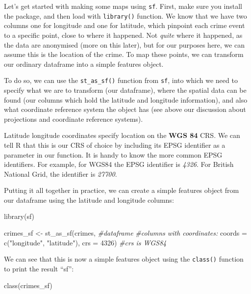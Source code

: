 \documentclass[
  krantz2]{krantz}
\makeatletter
\newenvironment{Shaded}{\begin{snugshade}}{\end{snugshade}}
\newcommand{\AttributeTok}[1]{\textcolor[rgb]{0.61,0.61,0.61}{#1}}
\newcommand{\CommentTok}[1]{\textcolor[rgb]{0.37,0.37,0.37}{\textit{#1}}}
\newcommand{\DecValTok}[1]{\textcolor[rgb]{0.06,0.06,0.06}{#1}}
\newcommand{\FunctionTok}[1]{\textcolor[rgb]{0,0,0}{#1}}
\newcommand{\NormalTok}[1]{#1}
\newcommand{\OtherTok}[1]{\textcolor[rgb]{0.37,0.37,0.37}{#1}}
\newcommand{\StringTok}[1]{\textcolor[rgb]{0.5,0.5,0.5}{#1}}
\newenvironment{kframe}{%
\medskip{}
\setlength{\fboxsep}{.8em}
 \def\at@end@of@kframe{}%
 \ifinner\ifhmode%
  \def\at@end@of@kframe{\end{minipage}}%
  \begin{minipage}{\columnwidth}%
 \fi\fi%
 \def\FrameCommand##1{\hskip\@totalleftmargin \hskip-\fboxsep
 \colorbox{shadecolor}{##1}\hskip-\fboxsep
     \hskip-\linewidth \hskip-\@totalleftmargin \hskip\columnwidth}%
 \MakeFramed {\advance\hsize-\width
   \@totalleftmargin\z@ \linewidth\hsize
   \@setminipage}}%
 {\par\unskip\endMakeFramed%
 \at@end@of@kframe}
\renewenvironment{Shaded}{\begin{kframe}}{\end{kframe}}
\makeatother
\begin{document}
Let's get started with making some maps using \texttt{sf}. First, make sure you install the package, and then load with \texttt{library()} function. We know that we have two columns one for longitude and one for latitude, which pinpoint each crime event to a specific point, close to where it happened. Not \emph{quite} where it happened, as the data are anonymised (more on this later), but for our purposes here, we can assume this is the location of the crime. To map these points, we can transform our ordinary dataframe into a simple features object.

To do so, we can use the \texttt{st\_as\_sf()} function from \texttt{sf}, into which we need to specify what we are to transform (our dataframe), where the spatial data can be found (our columns which hold the latitude and longitude information), and also what coordinate reference system the object has (see above our discussion about projections and coordinate reference systems).

Latitude longitude coordinates specify location on the \textbf{WGS 84} CRS. We can tell R that this is our CRS of choice by including its EPSG identifier as a parameter in our function. It is handy to know the more common EPSG identifiers. For example, for WGS84 the EPSG identifier is \emph{4326}. For British National Grid, the identifier is \emph{27700}.

Putting it all together in practice, we can create a simple features object from our dataframe using the latitude and longitude columns:

\begin{Shaded}
\begin{Highlighting}[]
\FunctionTok{library}\NormalTok{(sf)}

\NormalTok{crimes\_sf }\OtherTok{\textless{}{-}} \FunctionTok{st\_as\_sf}\NormalTok{(crimes,   }\CommentTok{\#dataframe}
                      \CommentTok{\#columns with coordinates:}
                      \AttributeTok{coords =} \FunctionTok{c}\NormalTok{(}\StringTok{"longitude"}\NormalTok{, }\StringTok{"latitude"}\NormalTok{), }
                      \AttributeTok{crs =} \DecValTok{4326}\NormalTok{)   }\CommentTok{\#crs is WGS84}
\end{Highlighting}
\end{Shaded}

We can see that this is now a simple features object using the \texttt{class()} function to print the result ``sf'':

\begin{Shaded}
\begin{Highlighting}[]
\FunctionTok{class}\NormalTok{(crimes\_sf)}
\end{Highlighting}
\end{Shaded}
\end{document}
